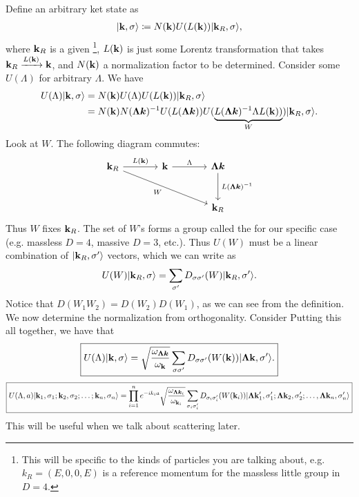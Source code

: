 \documentclass[11pt]{article}
\begin{document}
Define an arbitrary ket state as
\begin{align*}
    \lvert\mathbf{k}, \sigma\rangle \coloneqq N(\mathbf{k}) U(L(\mathbf{k})) \lvert\mathbf{k}_R, \sigma\rangle,
\end{align*}
where $\mathbf{k}_R$ is a given \footnote{This will
be specific to the kinds of particles you are talking about, e.g.
$k_R = (E, 0, 0, E)$ is a reference momentum for the massless little
group in $D = 4$.}, $L(\mathbf{k})$ is just some Lorentz transformation 
that takes $\mathbf{k}_R \xrightarrow{L(\mathbf{k})} \mathbf{k}$, and $N(\mathbf{k})$
a normalization factor to be determined. Consider some $U(\Lambda)$
for arbitrary $\Lambda$. We have
\begin{align*}
    U(\Lambda) \lvert\mathbf{k}, \sigma\rangle & = N(\mathbf{k}) U(\Lambda) U(L(\mathbf{k})) \lvert\mathbf{k}_R, \sigma\rangle\\
    & = N(\mathbf{k}) N(\boldsymbol{\Lambda k})^{-1} U(L(\boldsymbol{\Lambda k})) U(\underbrace{L(\boldsymbol{\Lambda k})^{-1} \Lambda L(\mathbf{k}))}_{W}) \lvert\mathbf{k}_R, \sigma\rangle.
\end{align*}
Look at $W$. The following diagram commutes:
\[
    \begin{tikzcd}[column sep=large, row sep=large]
    \bfk_R \arrow[r, "\,L(\bfk)\,"] \arrow[rrd, "\,W\,"'] & \bfk \arrow[r, "\,\Lambda\,"] & \boldsymbol{\Lambda k} \arrow[d, "\,L(\boldsymbol{\Lambda k})^{-1}\,"] \\
    & & \bfk_R
    \end{tikzcd}
\]
Thus $W$ fixes $\mathbf{k}_R$. The set of $W$'s forms a group called the
 for our specific case (e.g. massless $D = 4$,
massive $D = 3$, etc.). Thus $U(W)$ must be a linear combination of
$\lvert\mathbf{k}_R, \sigma'\rangle$ vectors, which we can write as
\begin{align*}
    U(W) \lvert\mathbf{k}_R, \sigma\rangle = \sum_{\sigma'} D_{\sigma \sigma'}(W) \lvert\mathbf{k}_R, \sigma'\rangle.
\end{align*}
Notice that $D(W_1 W_2) = D(W_2) D(W_1)$, as we can see from the definition.
We now determine the normalization from orthogonality. Consider 
Putting this all together, we have that
\begin{align*}
    \boxed{U(\Lambda)\lvert\mathbf{k}, \sigma\rangle = \sqrt{\frac{\omega_{\boldsymbol{\Lambda k}}}{\omega_{\mathbf{k}}}}\sum_{\sigma \sigma'} D_{\sigma \sigma'}(W(\mathbf{k})) \lvert\boldsymbol{\Lambda \mathbf{k}}, \sigma'\rangle.}
\end{align*}
\begin{align*}
    \boxed{U(\Lambda, a)\lvert\mathbf{k}_1, \sigma_1; \mathbf{k}_2, \sigma_2; \ldots ; \mathbf{k}_n, \sigma_n\rangle
    = \prod_{i = 1}^n e^{-i k_i a}\sqrt{\frac{\omega_{\boldsymbol{\Lambda k}_i}}{\omega_{\mathbf{k}_i}}} \sum_{\sigma_i \sigma_i'} D_{\sigma_i \sigma_i'}(W(\mathbf{k}_i)) \lvert\boldsymbol{\Lambda \mathbf{k}}_1', \sigma_1'; \boldsymbol{\Lambda \mathbf{k}}_2, \sigma_2'; \ldots, \boldsymbol{\Lambda \mathbf{k}}_n, \sigma_n'\rangle}
\end{align*}
This will be useful when we talk about scattering later.
\end{document}
